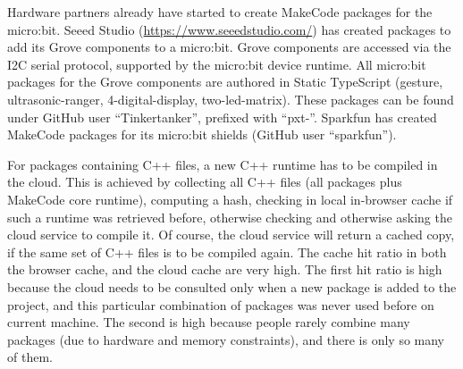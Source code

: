 Hardware partners already have started to create MakeCode packages for the micro:bit.
Seeed Studio (\url{https://www.seeedstudio.com/}) has created packages to add its Grove components to a micro:bit.
Grove components are accessed via the I2C serial protocol, supported by the micro:bit device runtime.
All micro:bit packages for the Grove components are authored in Static TypeScript (gesture, ultrasonic-ranger,
4-digital-display, two-led-matrix). These packages can be found under GitHub user ``Tinkertanker'', prefixed with
``pxt-''. Sparkfun has created MakeCode packages for its micro:bit shields (GitHub user ``sparkfun'').


For packages containing C++ files, a new C++ runtime has to be compiled in the cloud.
This is achieved by collecting all C++ files (all packages plus MakeCode core runtime),
computing a hash, checking in local in-browser cache if such a runtime was retrieved
before, otherwise checking and otherwise asking the cloud service to compile it.
Of course, the cloud service will return a cached copy, if the same set of C++
files is to be compiled again. The cache hit ratio in both the browser cache,
and the cloud cache are very high. 
The first hit ratio is high because the cloud needs to be consulted
only when a new package is added to the project, and this particular combination 
of packages was never used before on current machine.
The second is high because people rarely combine many packages (due to
hardware and memory constraints), and there is only so many of them.
